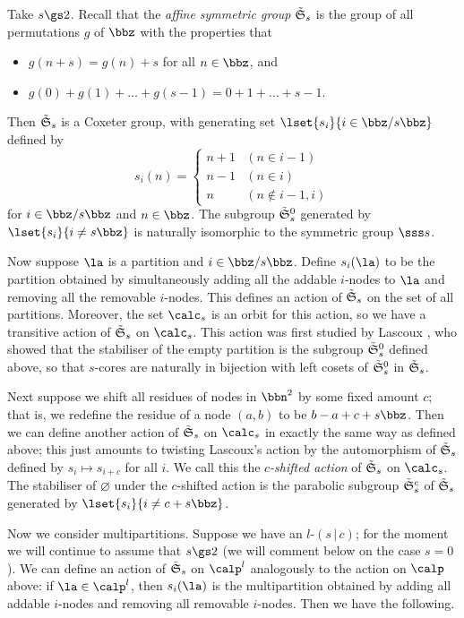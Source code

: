 \documentclass[a4paper, 11pt, twoside]{article}
\begin{document}
Take $s\gs2$. Recall that the \emph{affine symmetric group} $\tilde{\mathfrak S}_ s$ is the group of all permutations $g$ of $\bbz$ with the properties that
\begin{itemize}
\item
$g(n+s)=g(n)+s$ for all $n\in\bbz$, and
\item
$g(0)+g(1)+\dots+g(s-1)=0+1+\dots+s-1$.
\end{itemize}
Then $\tilde{\mathfrak S}_ s$ is a Coxeter group, with generating set $\lset{s_i}{i\in\zsz}$ defined by
\[
s_i(n)=
\begin{cases}
n+1&(n\in i-1)\\
n-1&(n\in i)\\
n&(n\notin i-1,i)
\end{cases}
\]
for $i\in\zsz$ and $n\in\bbz$. The subgroup $\tilde{\mathfrak S}_ s^0$ generated by $\lset{s_i}{i\neq s\bbz}$ is naturally isomorphic to the symmetric group $\sss s$.

Now suppose $\la$ is a partition and $i\in\zsz$. Define $s_i(\la)$ to be the partition obtained by simultaneously adding all the addable $i$-nodes to $\la$ and removing all the removable $i$-nodes. This defines an action of $\tilde{\mathfrak S}_ s$ on the set of all partitions. Moreover, the set $\cores s$ is an orbit for this action, so we have a transitive action of $\tilde{\mathfrak S}_ s$ on $\cores s$. This action was first studied by Lascoux \cite{las}, who showed that the stabiliser of the empty partition is the subgroup $\tilde{\mathfrak S}_ s^0$ defined above, so that $s$-cores are naturally in bijection with left cosets of $\tilde{\mathfrak S}_ s^0$ in $\tilde{\mathfrak S}_ s$.

Next suppose we shift all residues of nodes in $\bbn^2$ by some fixed amount $c$; that is, we redefine the residue of a node $(a,b)$ to be $b-a+c+s\bbz$. Then we can define another action of $\tilde{\mathfrak S}_ s$ on $\cores s$ in exactly the same way as defined above; this just amounts to twisting Lascoux's action by the automorphism of $\tilde{\mathfrak S}_ s$ defined by $s_i\mapsto s_{i+c}$ for all $i$. We call this the \emph{$c$-shifted action} of $\tilde{\mathfrak S}_ s$ on $\cores s$. The stabiliser of $\varnothing$ under the $c$-shifted action is the parabolic subgroup $\tilde{\mathfrak S}_ s^c$ of $\tilde{\mathfrak S}_ s$ generated by $\lset{s_i}{i\neq c+s\bbz}$.

Now we consider multipartitions. Suppose we have an $l$-\mcd $(s\,|\,c)$; for the moment we will continue to assume that $s\gs2$ (we will comment below on the case $s=0$). We can define an action of $\tilde{\mathfrak S}_ s$ on $\calp^l$ analogously to the action on $\calp$ above: if $\la\in\calp^l$, then $s_i(\la)$ is the multipartition obtained by adding all addable $i$-nodes and removing all removable $i$-nodes. Then we have the following.
\end{document}
